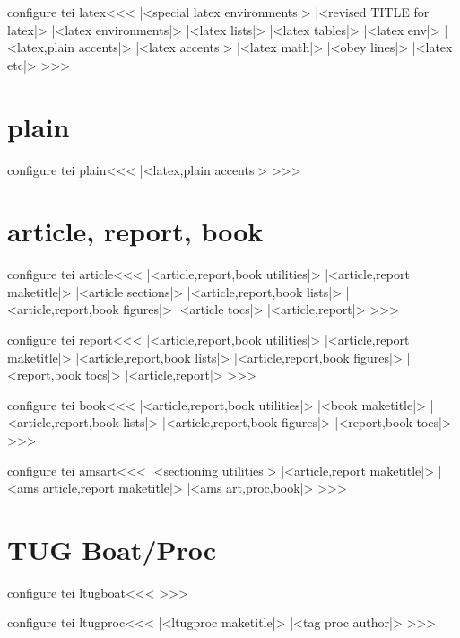 \<configure tei latex\><<< 
|<special latex environments|>
|<revised TITLE for latex|>
|<latex environments|>
|<latex lists|>
|<latex tables|>
|<latex env|>
|<latex,plain accents|>
|<latex accents|>
|<latex math|>
|<obey lines|>
|<latex etc|>
>>>




\section{plain}

\<configure tei plain\><<< 
|<latex,plain accents|>
>>>


\section{article, report, book}

\<configure tei article\><<< 
|<article,report,book utilities|>
|<article,report maketitle|>
|<article sections|>
|<article,report,book lists|>
|<article,report,book figures|>
|<article tocs|>
|<article,report|>
>>>


\<configure tei report\><<< 
|<article,report,book utilities|>
|<article,report maketitle|>
|<article,report,book lists|>
|<article,report,book figures|>
|<report,book tocs|>
|<article,report|>
>>>



\<configure tei book\><<< 
|<article,report,book utilities|>
|<book maketitle|>
|<article,report,book lists|>
|<article,report,book figures|>
|<report,book tocs|>
>>>


\<configure tei amsart\><<< 
|<sectioning utilities|>
|<article,report maketitle|>
|<ams article,report maketitle|>
|<ams art,proc,book|>
>>>


\section{TUG Boat/Proc}


\<configure tei ltugboat\><<< 
   {}
   {}
   {}
   {}
   {}
   {}
>>>


\<configure tei ltugproc\><<< 
|<ltugproc maketitle|>
   {|<tag proc author|>} 
   {}  
   {}      {}  
   {}
   {}
>>>

